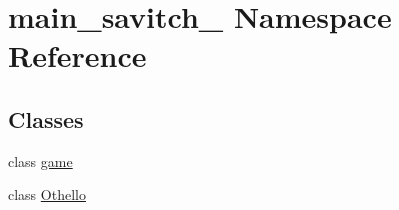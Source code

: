 \hypertarget{namespacemain__savitch__14}{}\section{main\+\_\+savitch\+\_ Namespace Reference}
\label{namespacemain__savitch__14}
\subsection*{Classes}
\begin{DoxyCompactItemize}
\item 
class \hyperlink{classmain__savitch__14_1_1game}{game}
\item 
class \hyperlink{classmain__savitch__14_1_1_othello}{Othello}
\end{DoxyCompactItemize}
